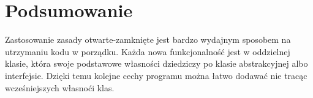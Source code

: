 \documentclass[11pt]{article}
\begin{document}
\section{Podsumowanie}
Zastosowanie zasady otwarte-zamknięte jest bardzo wydajnym sposobem na utrzymaniu kodu w porządku. Każda nowa funkcjonalność jest w oddzielnej klasie, która swoje podstawowe własności dziedziczy po klasie abstrakcyjnej albo interfejsie. Dzięki temu kolejne cechy programu można łatwo dodawać nie tracąc wcześniejszych własnoći klas.
\end{document}
